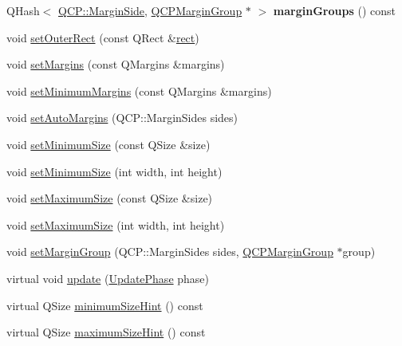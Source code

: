 \begin{DoxyCompactItemize}
\item 
Q\+Hash$<$ \hyperlink{namespace_q_c_p_a7e487e3e2ccb62ab7771065bab7cae54}{Q\+C\+P\+::\+Margin\+Side}, \hyperlink{class_q_c_p_margin_group}{Q\+C\+P\+Margin\+Group} $\ast$ $>$ {\bfseries margin\+Groups} () const \hypertarget{class_q_c_p_layout_element_ac43921c997570389c14a1671bc3ea499}{}\label{class_q_c_p_layout_element_ac43921c997570389c14a1671bc3ea499}

\item 
void \hyperlink{class_q_c_p_layout_element_a38975ea13e36de8e53391ce41d94bc0f}{set\+Outer\+Rect} (const Q\+Rect \&\hyperlink{class_q_c_p_layout_element_affdfea003469aac3d0fac5f4e06171bc}{rect})
\item 
void \hyperlink{class_q_c_p_layout_element_a8f450b1f3f992ad576fce2c63d8b79cf}{set\+Margins} (const Q\+Margins \&margins)
\item 
void \hyperlink{class_q_c_p_layout_element_a0a8a17abc16b7923159fcc7608f94673}{set\+Minimum\+Margins} (const Q\+Margins \&margins)
\item 
void \hyperlink{class_q_c_p_layout_element_accfda49994e3e6d51ed14504abf9d27d}{set\+Auto\+Margins} (Q\+C\+P\+::\+Margin\+Sides sides)
\item 
void \hyperlink{class_q_c_p_layout_element_a5dd29a3c8bc88440c97c06b67be7886b}{set\+Minimum\+Size} (const Q\+Size \&size)
\item 
void \hyperlink{class_q_c_p_layout_element_a8e0447614a0bf92de9a7304588c6b96e}{set\+Minimum\+Size} (int width, int height)
\item 
void \hyperlink{class_q_c_p_layout_element_a74eb5280a737ab44833d506db65efd95}{set\+Maximum\+Size} (const Q\+Size \&size)
\item 
void \hyperlink{class_q_c_p_layout_element_a03e0e9c48f230217c529b0819f832d84}{set\+Maximum\+Size} (int width, int height)
\item 
void \hyperlink{class_q_c_p_layout_element_a516e56f76b6bc100e8e71d329866847d}{set\+Margin\+Group} (Q\+C\+P\+::\+Margin\+Sides sides, \hyperlink{class_q_c_p_margin_group}{Q\+C\+P\+Margin\+Group} $\ast$group)
\item 
virtual void \hyperlink{class_q_c_p_layout_element_a929c2ec62e0e0e1d8418eaa802e2af9b}{update} (\hyperlink{class_q_c_p_layout_element_a0d83360e05735735aaf6d7983c56374d}{Update\+Phase} phase)
\item 
virtual Q\+Size \hyperlink{class_q_c_p_layout_element_aebe14fb71f858c0f98caf8d342a9864a}{minimum\+Size\+Hint} () const 
\item 
virtual Q\+Size \hyperlink{class_q_c_p_layout_element_adbd3a00fec44c977150c6be7329eb801}{maximum\+Size\+Hint} () const 

\end{DoxyCompactItemize}
